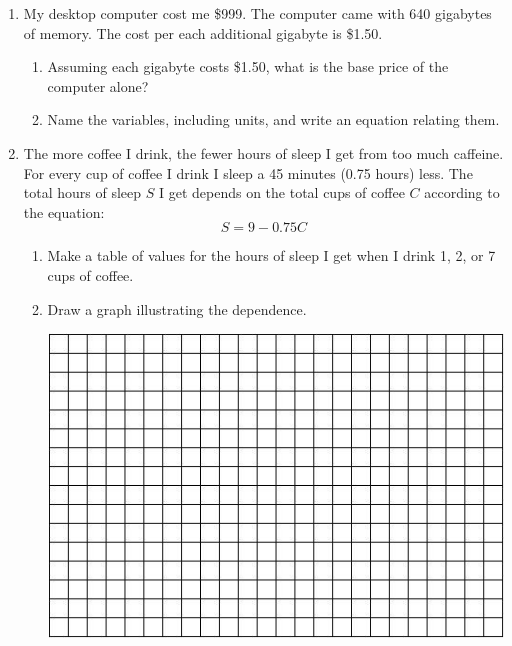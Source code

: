 \documentclass[12pt]{article}
\begin{document}
\begin{enumerate}
\item My desktop computer cost me \$999.  The computer came with 640 gigabytes of memory.  The cost per each additional gigabyte is \$1.50.  

\begin{enumerate}
\item Assuming each gigabyte costs \$1.50, what is the base price of the computer alone?
\vfill

\item Name the variables, including units, and write an equation relating them.
\vfill
\vfill
\end{enumerate}

\newpage %
\item The more coffee I drink, the fewer hours of sleep I get from too much caffeine.  For every cup of coffee I drink I sleep a 45 minutes (0.75 hours) less.  The total hours of sleep $S$ I get depends on the total cups of coffee $C$ according to the equation: $$S=9-0.75C$$

\begin{enumerate}
\item Make a table of values for the hours of sleep I get when I drink 1, 2, or 7 cups of coffee. 
\vfill
\vfill
\item Draw a graph illustrating the dependence.  

\vspace{.1in}
\begin{center}
 {\includegraphics [width = 6in] {../GraphPaper}}
\end{center}
\vspace{.1in}


\end{enumerate}
\end{enumerate}
\end{document}

